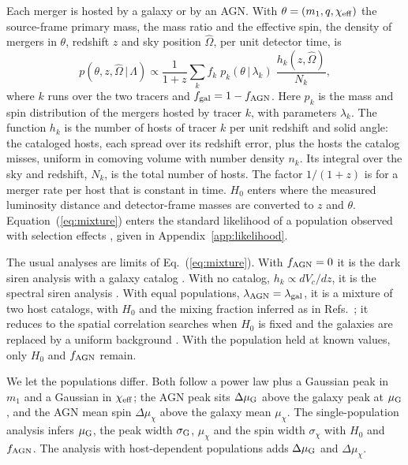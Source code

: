 \documentclass[aps,prd,reprint,superscriptaddress,nofootinbib,nolongbibliography,floatfix]{revtex4-2}
\newcommand{\fagn}{f_{\rm AGN}}
\newcommand{\dmug}{\Delta\mu_{\rm G}}
\newcommand{\dmuchi}{\Delta\mu_{\chi}}
\newcommand{\chieff}{\chi_{\rm eff}}
\begin{document}
Each merger is hosted by a galaxy or by an AGN.
With $\theta=(m_1,q,\chieff)$ the source-frame primary mass, the mass ratio and the effective spin, the density of mergers in $\theta$, redshift $z$ and sky position $\hat\Omega$, per unit detector time, is
\begin{equation}
p(\theta,z,\hat\Omega\,|\,\Lambda)\propto\frac{1}{1+z}\sum_{k}f_k\;p_k(\theta\,|\,\lambda_k)\;\frac{h_k(z,\hat\Omega)}{N_k},
\label{eq:mixture}
\end{equation}
where $k$ runs over the two tracers and $f_{\rm gal}=1-\fagn$.
Here $p_k$ is the mass and spin distribution of the mergers hosted by tracer $k$, with parameters $\lambda_k$.
The function $h_k$ is the number of hosts of tracer $k$ per unit redshift and solid angle: the cataloged hosts, each spread over its redshift error, plus the hosts the catalog misses, uniform in comoving volume with number density $n_k$.
Its integral over the sky and redshift, $N_k$, is the total number of hosts.
The factor $1/(1+z)$ is for a merger rate per host that is constant in time.
$H_0$ enters where the measured luminosity distance and detector-frame masses are converted to $z$ and $\theta$.
Equation~(\ref{eq:mixture}) enters the standard likelihood of a population observed with selection effects \cite{Loredo:2004nn,Mandel:2018mve,Thrane:2018qnx,Vitale:2020aaz}, given in Appendix~\ref{app:likelihood}.

The usual analyses are limits of Eq.~(\ref{eq:mixture}).
With $\fagn=0$ it is the dark siren analysis with a galaxy catalog \cite{Gray:2019ksv,Gair:2022zsa,Gray:2023wgj,Mastrogiovanni:2023emh}.
With no catalog, $h_k\propto dV_c/dz$, it is the spectral siren analysis \cite{Taylor:2011fs,Farr:2019twy,Ezquiaga:2022zkx}.
With equal populations, $\lambda_{\rm AGN}=\lambda_{\rm gal}$, it is a mixture of two host catalogs, with $H_0$ and the mixing fraction inferred as in Refs.~\cite{Bom:2023zgw,Cross-Parkin:2026pua}; it reduces to the spatial correlation searches when $H_0$ is fixed and the galaxies are replaced by a uniform background \cite{Bartos:2017ggb,Veronesi:2023ugk,Pouw:2026lar}.
With the population held at known values, only $H_0$ and $\fagn$ remain.

We let the populations differ.
Both follow a power law plus a Gaussian peak in $m_1$ \cite{Talbot:2018cva} and a Gaussian in $\chieff$; the AGN peak sits $\dmug$ above the galaxy peak at $\mu_{\rm G}$, and the AGN mean spin $\dmuchi$ above the galaxy mean $\mu_\chi$.
The single-population analysis infers $\mu_{\rm G}$, the peak width $\sigma_{\rm G}$, $\mu_\chi$ and the spin width $\sigma_\chi$ with $H_0$ and $\fagn$.
The analysis with host-dependent populations adds $\dmug$ and $\dmuchi$.
\end{document}
